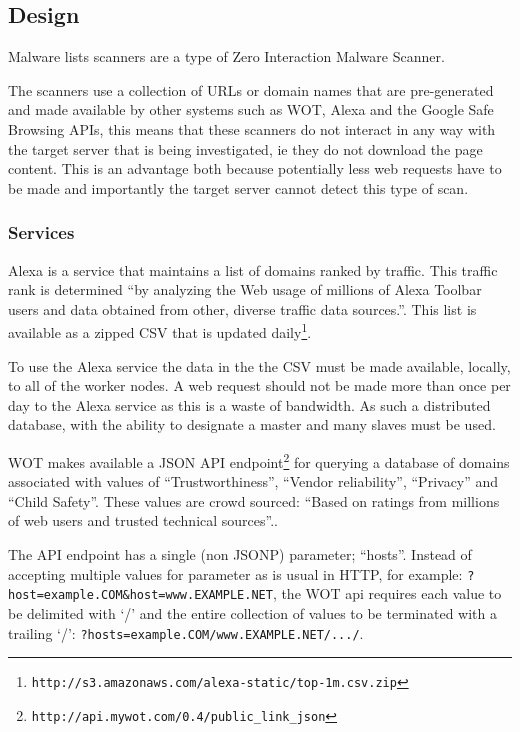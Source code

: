\subsection{Design}
Malware lists scanners are a type of Zero Interaction Malware Scanner.

The scanners use a collection of URLs or domain names that are pre-generated and made available by other systems such as WOT, Alexa and the Google Safe Browsing APIs, this means that these scanners do not interact in any way with the target server that is being investigated, ie they do not download the page content. This is an advantage both because potentially less web requests have to be made and importantly the target server cannot detect this type of scan.


\subsubsection{Services}
Alexa is a service that maintains a list of domains ranked by traffic. This traffic rank is determined ``by analyzing the Web usage of millions of Alexa Toolbar users and data obtained from other, diverse traffic data sources.''\cite{alexa-about}. This list is available as a zipped CSV that is updated daily\footnote{\verb`http://s3.amazonaws.com/alexa-static/top-1m.csv.zip`}.

To use the Alexa service the data in the the CSV must be made available, locally, to all of the worker nodes. A web request should not be made more than once per day to the Alexa service as this is a waste of bandwidth. As such a distributed database, with the ability to designate a master and many slaves must be used.

WOT makes available a JSON API endpoint\footnote{\verb`http://api.mywot.com/0.4/public_link_json`} for querying a database of domains associated with values of ``Trustworthiness'', ``Vendor reliability'', ``Privacy'' and ``Child Safety''. These values are crowd sourced: ``Based on ratings from millions of web users and trusted technical sources''.\cite{wot-about}.

The API endpoint has a single (non JSONP\cite{JSONP}) parameter; ``hosts''. Instead of accepting multiple values for parameter as is usual in HTTP, for example: \verb`?host=example.COM&host=www.EXAMPLE.NET`, the WOT api requires each value to be delimited with `/' and the entire collection of values to be terminated with a trailing `/': \verb`?hosts=example.COM/www.EXAMPLE.NET/.../`.

